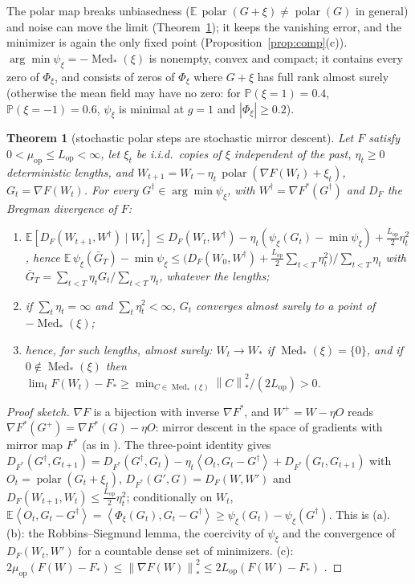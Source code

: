 \documentclass[10pt]{article}
\newtheorem{theorem}{Theorem}
\theoremstyle{remark}
\newcommand{\E}{\mathbb{E}}
\newcommand{\Prob}{\mathbb{P}}
\newcommand{\nnuc}[1]{\left\|#1\right\|_{*}}
\newcommand{\inner}[2]{\left\langle #1, #2 \right\rangle}
\newcommand{\abs}[1]{\left|#1\right|}
\newcommand{\polar}{\operatorname{polar}}
\newcommand{\Med}{\operatorname{Med}_\ast}
\newcommand{\Lop}{L_{\mathrm{op}}}
\newcommand{\muop}{\mu_{\mathrm{op}}}
\begin{document}
The polar map breaks unbiasedness ($\E\,\polar(G+\xi)\ne\polar(G)$ in general) and noise can move the limit
(Theorem~\ref{thm:smd}); it keeps the vanishing error, and the minimizer is again the only fixed point
(Proposition~\ref{prop:comp}(c)). $\arg\min\psi_\xi=-\Med(\xi)$ is nonempty, convex and compact; it contains every zero of
$\Phi_\xi$, and consists of zeros of $\Phi_\xi$ where $G+\xi$ has full rank almost surely (otherwise the mean field may
have no zero: for $\Prob(\xi=1)=0.4$, $\Prob(\xi=-1)=0.6$, $\psi_\xi$ is minimal at $g=1$ and $\abs{\Phi_\xi}\ge0.2$).

\begin{theorem}[stochastic polar steps are stochastic mirror descent]\label{thm:smd}
Let $F$ satisfy $0<\muop\le\Lop<\infty$, let $\xi_t$ be i.i.d.\ copies of $\xi$ independent of the past, $\eta_t\ge0$
deterministic lengths, and $W_{t+1}=W_t-\eta_t\,\polar(\nabla F(W_t)+\xi_t)$, $G_t=\nabla F(W_t)$. For every
$G^\dagger\in\arg\min\psi_\xi$, with $W^\dagger=\nabla F^\ast(G^\dagger)$ and $D_F$ the Bregman divergence of $F$:
\begin{enumerate}[label=(\alph*),itemsep=0pt,topsep=2pt]
\item $\E[D_F(W_{t+1},W^\dagger)\mid W_t]\le D_F(W_t,W^\dagger)-\eta_t(\psi_\xi(G_t)-\min\psi_\xi)+\frac{\Lop}2\eta_t^2$,
hence $\E\,\psi_\xi(\bar G_T)-\min\psi_\xi\le\big(D_F(W_0,W^\dagger)+\frac{\Lop}2\sum_{t<T}\eta_t^2\big)/\sum_{t<T}\eta_t$
with $\bar G_T=\sum_{t<T}\eta_tG_t/\sum_{t<T}\eta_t$, whatever the lengths;
\item if $\sum_t\eta_t=\infty$ and $\sum_t\eta_t^2<\infty$, $G_t$ converges almost surely to a point of $-\Med(\xi)$;
\item hence, for such lengths, almost surely: $W_t\to W_\ast$ if $\Med(\xi)=\{0\}$, and if $0\notin\Med(\xi)$ then
$\lim_tF(W_t)-F_\ast\ge\min_{C\in\Med(\xi)}\nnuc C^2/(2\Lop)>0$.
\end{enumerate}
\end{theorem}
\begin{proof}[Proof sketch]
$\nabla F$ is a bijection with inverse $\nabla F^\ast$, and $W^+=W-\eta O$ reads $\nabla F^\ast(G^+)=\nabla F^\ast(G)-\eta O$:
mirror descent in the space of gradients with mirror map $F^\ast$ (as in \cite{maddison2021dual}). The three-point identity
gives $D_{F^\ast}(G^\dagger,G_{t+1})=D_{F^\ast}(G^\dagger,G_t)-\eta_t\inner{O_t}{G_t-G^\dagger}+D_{F^\ast}(G_t,G_{t+1})$ with
$O_t=\polar(G_t+\xi_t)$, $D_{F^\ast}(G',G)=D_F(W,W')$ and $D_F(W_{t+1},W_t)\le\frac{\Lop}2\eta_t^2$; conditionally on $W_t$,
$\E\inner{O_t}{G_t-G^\dagger}=\inner{\Phi_\xi(G_t)}{G_t-G^\dagger}\ge\psi_\xi(G_t)-\psi_\xi(G^\dagger)$. This is (a). (b): the
Robbins--Siegmund lemma, the coercivity of $\psi_\xi$ and the convergence of $D_F(W_t,W')$ for a countable dense set of
minimizers. (c): $2\muop(F(W)-F_\ast)\le\nnuc{\nabla F(W)}^2\le2\Lop(F(W)-F_\ast)$ \cite{balles2020geometry}.
\end{proof}
\end{document}
